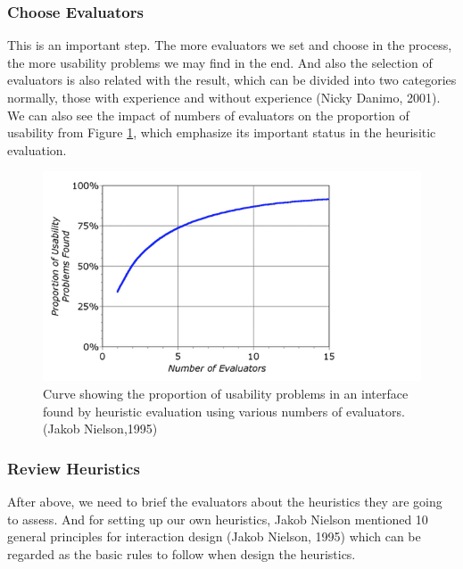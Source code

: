 \documentclass[twocolumn]{article}
\begin{document}
\subsubsection{Choose Evaluators}
This is an important step. The more evaluators we set and choose in the process, the more usability problems we may find in the end. And also the selection of evaluators is also related with the result, which can be divided into two categories normally, those with experience and without experience (Nicky Danimo, 2001). We can also see the impact of numbers of evaluators on the proportion of usability from Figure \ref{fig:usability-problems-found}, which emphasize its important status in the heurisitic evaluation.

\begin{figure}
  \centering
  \includegraphics[width=\columnwidth, clip=true, trim=0 0 140 0]{fig/usability-problems-found.png}
  \caption{Curve showing the proportion of usability problems in an interface found by heuristic evaluation using various numbers of evaluators. (Jakob Nielson,1995)}
  \label{fig:usability-problems-found}
\end{figure}

\subsubsection{Review Heuristics}
After above, we need to brief the evaluators about the heuristics they are going to assess. And for setting up our own heuristics, Jakob Nielson mentioned 10 general principles for interaction design (Jakob Nielson, 1995) which can be regarded as the basic rules to follow when design the heuristics.
\end{document}
